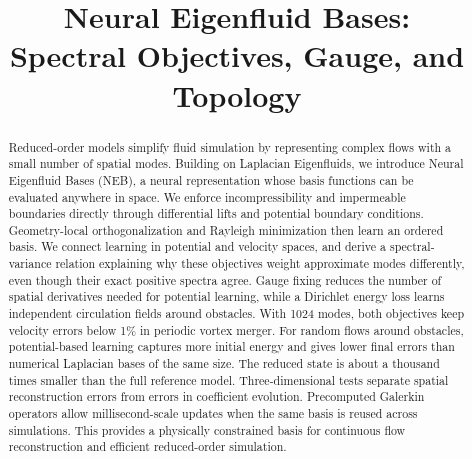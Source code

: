 \documentclass[11pt,letterpaper]{article}
\title{Neural Eigenfluid Bases:\\Spectral Objectives, Gauge, and Topology}
\date{}
\begin{document}
\maketitle
\begin{abstract}
\begingroup
Reduced-order models simplify fluid simulation by representing complex flows with a small number of spatial modes. Building on Laplacian Eigenfluids, we introduce Neural Eigenfluid Bases (NEB), a neural representation whose basis functions can be evaluated anywhere in space. We enforce incompressibility and impermeable boundaries directly through differential lifts and potential boundary conditions. Geometry-local orthogonalization and Rayleigh minimization then learn an ordered basis. We connect learning in potential and velocity spaces, and derive a spectral-variance relation explaining why these objectives weight approximate modes differently, even though their exact positive spectra agree. Gauge fixing reduces the number of spatial derivatives needed for potential learning, while a Dirichlet energy loss learns independent circulation fields around obstacles. With 1024 modes, both objectives keep velocity errors below 1\% in periodic vortex merger. For random flows around obstacles, potential-based learning captures more initial energy and gives lower final errors than numerical Laplacian bases of the same size. The reduced state is about a thousand times smaller than the full reference model. Three-dimensional tests separate spatial reconstruction errors from errors in coefficient evolution. Precomputed Galerkin operators allow millisecond-scale updates when the same basis is reused across simulations. This provides a physically constrained basis for continuous flow reconstruction and efficient reduced-order simulation.
\par\endgroup
\end{abstract}









\begingroup
\small
\setlength{\bibsep}{1.2pt plus .5pt}

\endgroup
\appendix



\end{document}
